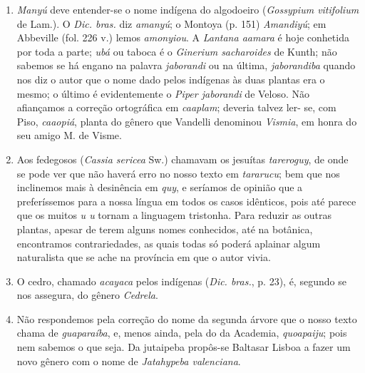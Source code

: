\begin{enumerate}
\item  \textit{Manyú} deve entender-se o nome indígena do algodoeiro (\textit{Gossypium vitifolium} de 
Lam.). O \textit{Dic. bras.} diz \textit{amanyú}; o Montoya (p. 151) \textit{Amandiyú}; em Abbeville (fol. 226 v.) 
lemos \textit{amonyiou}. A \textit{Lantana aamara} é hoje conhetida por toda a parte; \textit{ubá} ou taboca é o 
\textit{Ginerium sacharoides} de Kunth; não sabemos se há 
engano na palavra \textit{jaborandi} ou na última, \textit{jaborandiba} quando nos diz o autor que o 
nome dado pelos indígenas às duas plantas era o mesmo; o último é evidentemente o 
\textit{Piper jaborandi} de Veloso. Não afiançamos a correção ortográfica em \textit{caaplam}; deveria talvez ler- 
se, com Piso, \textit{caaopiá}, planta do gênero que Vandelli denominou \textit{Vismia}, em honra do seu 
amigo M. de Visme.

\item Aos fedegosos (\textit{Cassia sericea} Sw.) chamavam os jesuítas \textit{tareroguy}, de onde se 
pode ver que não haverá erro no nosso texto em \textit{tararucu}; bem que nos inclinemos mais 
à desinência em \textit{quy}, e seríamos de opinião que a preferíssemos para a nossa língua em 
todos os casos idênticos, pois até parece que os muitos \textit{u u} tornam a linguagem 
tristonha. Para reduzir as outras plantas, apesar de terem alguns nomes conhecidos, até 
na botânica, encontramos contrariedades, as quais todas só poderá aplainar algum 
naturalista que se ache na província em que o autor vivia.

\item O cedro, chamado \textit{acayaca} pelos indígenas (\textit{Dic. bras.}, p. 23), é, segundo se nos 
assegura, do gênero \textit{Cedrela}.

\item Não respondemos pela correção do nome da segunda árvore que o nosso texto 
chama de \textit{guaparaíba}, e, menos ainda, pela do da Academia, \textit{quoapaiju}; pois nem 
sabemos o que seja. Da jutaipeba propôs-se Baltasar Lisboa a fazer um novo gênero 
com o nome de \textit{Jatahypeba valenciana}.


\end{enumerate}
